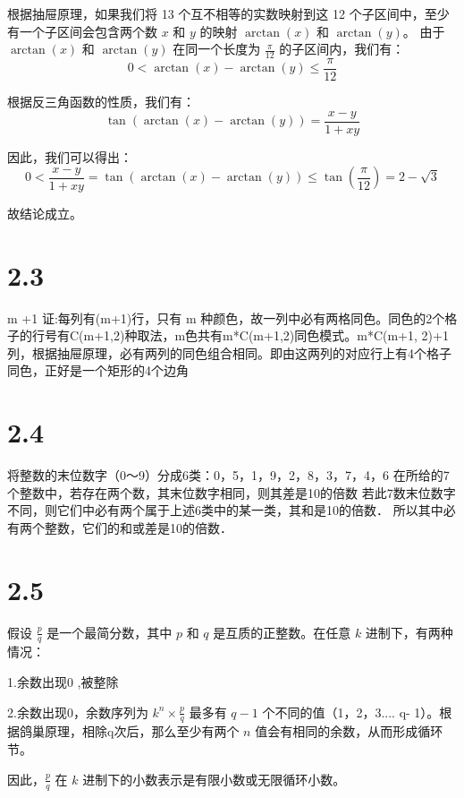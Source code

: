 \documentclass{article}
\begin{document}
\begin{CJK}{UTF8}{gbsn}
根据抽屉原理，如果我们将 13 个互不相等的实数映射到这 12 个子区间中，至少有一个子区间会包含两个数 \( x \) 和 \( y \) 的映射 \( \arctan(x) \) 和 \( \arctan(y) \)。
由于 \( \arctan(x) \) 和 \( \arctan(y) \) 在同一个长度为 \( \frac{\pi}{12} \) 的子区间内，我们有：
\[
0 < \arctan(x) - \arctan(y) \leq \frac{\pi}{12}
\]

根据反三角函数的性质，我们有：
\[
\tan(\arctan(x) - \arctan(y)) = \frac{x - y}{1 + xy}
\]

因此，我们可以得出：
\[
0 < \frac{x - y}{1 + xy} = \tan(\arctan(x) - \arctan(y)) \leq \tan\left(\frac{\pi}{12}\right) = 2 - \sqrt{3}
\]

故结论成立。
\section*{2.3}
m +1
证:每列有(m+1)行，只有 m 种颜色，故一列中必有两格同色。同色的2个格子的行号有C(m+1,2)种取法，m色共有m*C(m+1,2)同色模式。m*C(m+1, 2)+1列，根据抽屉原理，必有两列的同色组合相同。即由这两列的对应行上有4个格子同色，正好是一个矩形的4个边角
\section*{2.4}
将整数的末位数字（0～9）分成6类：{0}，{5}，{1，9}，{2，8}，{3，7}，{4，6}
在所给的7个整数中，若存在两个数，其末位数字相同，则其差是10的倍数
若此7数末位数字不同，则它们中必有两个属于上述6类中的某一类，其和是10的倍数．
所以其中必有两个整数，它们的和或差是10的倍数．
\section*{2.5}
假设 \( \frac{p}{q} \) 是一个最简分数，其中 \( p \) 和 \( q \) 是互质的正整数。在任意 \( k \) 进制下，有两种情况：

1.余数出现0 ,被整除

2.余数出现0，余数序列为 \( k^n \times \frac{p}{q} \) 最多有 \( q-1 \) 个不同的值（1，2，3.... q-
1）。根据鸽巢原理，相除q次后，那么至少有两个 \( n \) 值会有相同的余数，从而形成循环节。


因此，\( \frac{p}{q} \) 在 \( k \) 进制下的小数表示是有限小数或无限循环小数。
\end{CJK}
\end{document}
